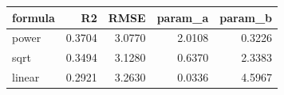 \begin{tabular}{lrrrr}
\toprule
formula & R2 & RMSE & param\_a & param\_b \\
\midrule
power & 0.3704 & 3.0770 & 2.0108 & 0.3226 \\
sqrt & 0.3494 & 3.1280 & 0.6370 & 2.3383 \\
linear & 0.2921 & 3.2630 & 0.0336 & 4.5967 \\
\bottomrule
\end{tabular}
